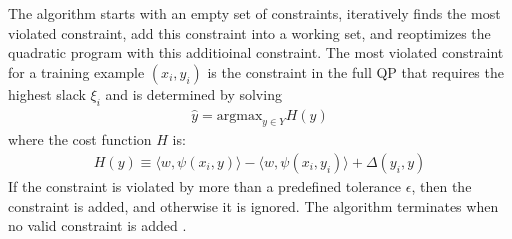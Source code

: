 The algorithm starts with an empty set of constraints, iteratively finds the most violated constraint, add this constraint into a working set, and reoptimizes the quadratic program with this additioinal constraint. The most violated constraint for a training example $(x_i, y_i)$ is the constraint in the full QP that requires the highest slack $\xi _i$ and is determined by solving 
\begin{align}
\hat{y} = \text{argmax} _{y \in Y} H(y)
\end{align}
where the cost function $H$ is:
\begin{align}
H(y) \equiv \langle w, \psi(x_i, y) \rangle - \langle w, \psi (x_i, y_i) \rangle + \Delta (y_i, y)
\end{align}
If the constraint is violated by more than a predefined tolerance $\epsilon$, then the constraint is added, and otherwise it is ignored. The algorithm terminates when no valid constraint is added \cite{Finley2009}.

